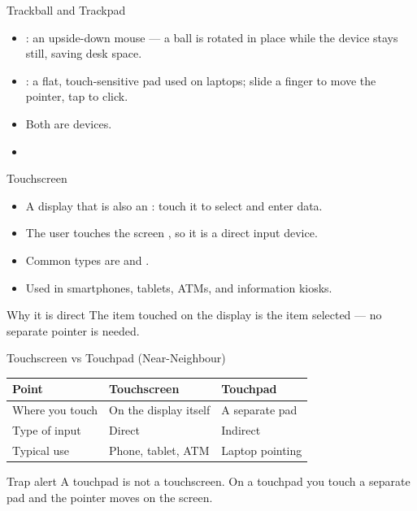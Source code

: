 \documentclass[aspectratio=169]{beamer}
\begin{document}
\begin{frame}{Trackball and Trackpad}
  \begin{itemize}
    \item {}: an upside-down mouse --- a ball is rotated in
      place while the device stays still, saving desk space.
    \item {}: a flat, touch-sensitive pad used on
      laptops; slide a finger to move the pointer, tap to click.
    \item Both are  devices.
    \item {}
  \end{itemize}
\end{frame}

\begin{frame}{Touchscreen}
  \begin{itemize}
    \item A display that is also an : touch it to select
      and enter data.
    \item The user touches the screen , so it is a direct
      input device.
    \item Common types are  and .
    \item Used in smartphones, tablets, ATMs, and information kiosks.
  \end{itemize}
  \begin{block}{Why it is direct}
    The item touched on the display is the item selected --- no separate
    pointer is needed.
  \end{block}
\end{frame}

\begin{frame}{Touchscreen vs Touchpad (Near-Neighbour)}
  \begin{center}
    \begin{tabular}{lll}
      \toprule
      \textbf{Point} & \textbf{Touchscreen} & \textbf{Touchpad} \\
      \midrule
      Where you touch & On the display itself & A separate pad \\
      Type of input & Direct & Indirect \\
      Typical use & Phone, tablet, ATM & Laptop pointing \\
      \bottomrule
    \end{tabular}
  \end{center}
  \vspace{0.3cm}
  \begin{alertblock}{Trap alert}
    A touchpad is not a touchscreen. On a touchpad you touch a separate pad
    and the pointer moves on the screen.
  \end{alertblock}
\end{frame}
\end{document}
